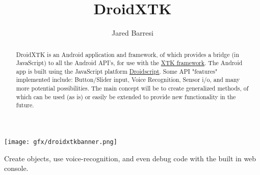 \documentclass[sigconf]{acmart}
\begin{document}
    
    \title{DroidXTK}
    
    \author{Jared Barresi}
    
    \renewcommand{\shortauthors}{}
    
    \begin{abstract}
     DroidXTK is an Android application and framework, of which provides a bridge (in JavaScript) to all the Android API's, for use with the \textcolor{blue}{\hyperlink{http://www.goxtk.com}{XTK framework}}. The Android app is built using the JavaScript platform \textcolor{blue}{\hyperlink{http://www.androidscript.org}{Droidscript}}. Some API "features" implemented include: Button/Slider input, Voice Recognition, Sensor i/o, and many more potential possibilities. The main concept will be to create generalized methods, of which can be used (as is) or easily be extended to provide new functionality in the future.
    \end{abstract}
    
    
    \begin{teaserfigure}
      \texttt{[image: gfx/droidxtkbanner.png]}
      \caption{Create objects, use voice-recognition, and even debug code with the built in web console.  }
      \label{fig:teaser}
    \end{teaserfigure}
    
\end{document}

